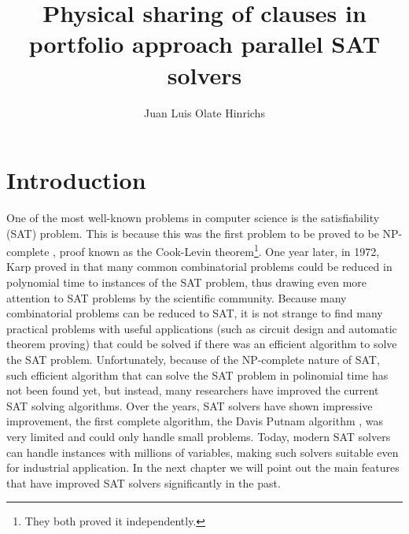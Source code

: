 \documentclass[12pt]{diicc}
\title{\bf Physical sharing of clauses in portfolio approach parallel SAT solvers}
\author{Juan Luis Olate Hinrichs}
\begin{document}
\frontmatter

%


%


%
% 
\mainmatter
\chapter{Introduction}\label{chap:intro}

One of the most well-known problems in computer science is the satisfiability (SAT) problem. This is because this was the first problem to be proved to be NP-complete \cite{cook1971}, proof known as the Cook-Levin theorem\footnote[1]{They both proved it independently.}. One year later, in 1972, Karp proved in \cite{karp1972} that many common combinatorial problems could be reduced in polynomial time to instances of the SAT problem, thus drawing even more attention to SAT problems by the scientific community. Because many combinatorial problems can be reduced to SAT, it is not strange to find many practical problems with useful applications (such as circuit design and automatic theorem proving) that could be solved if there was an efficient algorithm to solve the SAT problem. Unfortunately, because of the NP-complete nature of SAT, such efficient algorithm that can solve the SAT problem in polinomial time has not been found yet, but instead, many researchers have improved the current SAT solving algorithms. Over the years, SAT solvers have shown impressive improvement, the first complete algorithm, the Davis Putnam algorithm \cite{DP1960}, was very limited and could only handle small problems. Today, modern SAT solvers can handle instances with millions of variables, making such solvers suitable even for industrial application. In the next chapter we will point out the main features that have improved SAT solvers significantly in the past.
\end{document}
